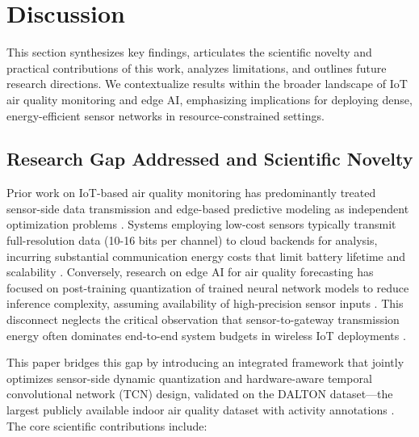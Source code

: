 \section{Discussion}
\label{sec:discussion}

This section synthesizes key findings, articulates the scientific novelty and practical contributions of this work, analyzes limitations, and outlines future research directions. We contextualize results within the broader landscape of IoT air quality monitoring and edge AI, emphasizing implications for deploying dense, energy-efficient sensor networks in resource-constrained settings.

\subsection{Research Gap Addressed and Scientific Novelty}

Prior work on IoT-based air quality monitoring has predominantly treated sensor-side data transmission and edge-based predictive modeling as independent optimization problems \cite{garcia2025advancements, peixe2024lowcost}. Systems employing low-cost sensors typically transmit full-resolution data (10-16 bits per channel) to cloud backends for analysis, incurring substantial communication energy costs that limit battery lifetime and scalability \cite{zaid2025investigating, bagkis2025evolving}. Conversely, research on edge AI for air quality forecasting has focused on post-training quantization of trained neural network models to reduce inference complexity, assuming availability of high-precision sensor inputs \cite{mazinani2025air, davoli2024edge}. This disconnect neglects the critical observation that sensor-to-gateway transmission energy often dominates end-to-end system budgets in wireless IoT deployments \cite{khan2024artificial, przystupa2025ensuring}.

This paper bridges this gap by introducing an integrated framework that jointly optimizes sensor-side dynamic quantization and hardware-aware temporal convolutional network (TCN) design, validated on the DALTON dataset—the largest publicly available indoor air quality dataset with activity annotations \cite{karmakar2024indoor}. The core scientific contributions include:

